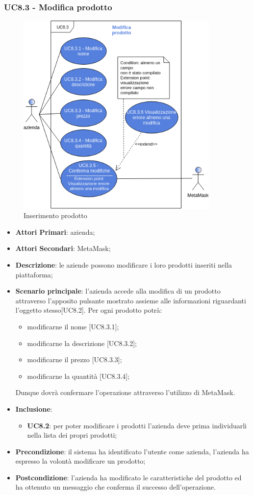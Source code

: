 \subsubsection{UC8.3 - Modifica prodotto}
\begin{figure}[H]
	\includegraphics[width=10cm]{res/images/UC8-Modifica.png}
	\centering
	\caption{Inserimento prodotto}
\end{figure}
\begin{itemize}
	\item \textbf{Attori Primari}: azienda;
	\item \textbf{Attori Secondari}: MetaMask\glo;
	\item \textbf{Descrizione}: le aziende possono modificare i loro prodotti inseriti nella piattaforma;
	\item \textbf{Scenario principale}: l'azienda accede alla modifica di un prodotto attraverso l'apposito pulsante mostrato assieme alle informazioni riguardanti l'oggetto stesso[UC8.2]. Per ogni prodotto potrà: 
	\begin{itemize}
		\item modificarne il nome [UC8.3.1];
		\item modificarne la descrizione [UC8.3.2];
		\item modificarne il prezzo [UC8.3.3];
		\item modificarne la quantità [UC8.3.4];
	\end{itemize}
	Dunque dovrà confermare l'operazione attraverso l'utilizzo di MetaMask\glo.
	\item \textbf{Inclusione}:
	\begin{itemize}
		\item \textbf{UC8.2}: per poter modificare i prodotti l'azienda deve prima individuarli nella lista dei propri prodotti;
	\end{itemize}
	\item \textbf{Precondizione}: il sistema ha identificato l'utente come azienda, l'azienda ha espresso la volontà modificare un prodotto;
	\item \textbf{Postcondizione}: l'azienda ha modificato le caratteristiche del prodotto ed ha ottenuto un messaggio che conferma il successo dell'operazione.	
\end{itemize}

